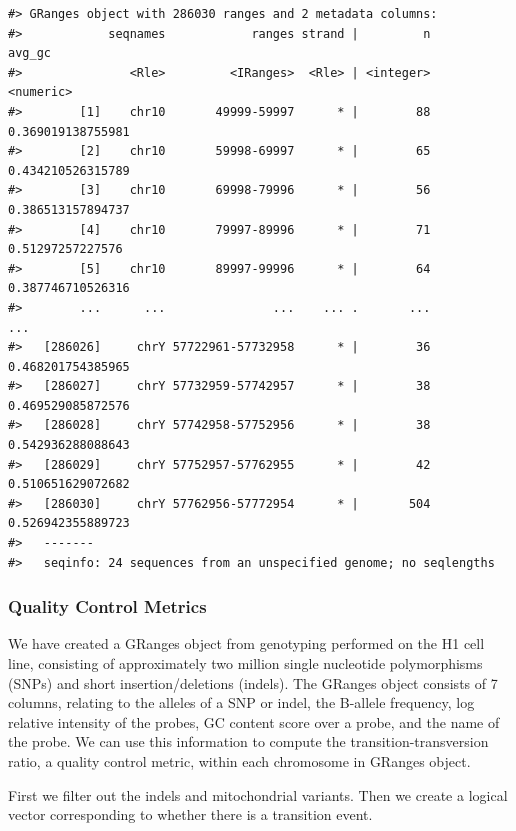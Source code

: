 \documentclass[]{article}
\begin{document}
\begin{verbatim}
#> GRanges object with 286030 ranges and 2 metadata columns:
#>            seqnames            ranges strand |         n            avg_gc
#>               <Rle>         <IRanges>  <Rle> | <integer>         <numeric>
#>        [1]    chr10       49999-59997      * |        88 0.369019138755981
#>        [2]    chr10       59998-69997      * |        65 0.434210526315789
#>        [3]    chr10       69998-79996      * |        56 0.386513157894737
#>        [4]    chr10       79997-89996      * |        71  0.51297257227576
#>        [5]    chr10       89997-99996      * |        64 0.387746710526316
#>        ...      ...               ...    ... .       ...               ...
#>   [286026]     chrY 57722961-57732958      * |        36 0.468201754385965
#>   [286027]     chrY 57732959-57742957      * |        38 0.469529085872576
#>   [286028]     chrY 57742958-57752956      * |        38 0.542936288088643
#>   [286029]     chrY 57752957-57762955      * |        42 0.510651629072682
#>   [286030]     chrY 57762956-57772954      * |       504 0.526942355889723
#>   -------
#>   seqinfo: 24 sequences from an unspecified genome; no seqlengths
\end{verbatim}

\hypertarget{quality-control-metrics}{%
\subsubsection{Quality Control Metrics}\label{quality-control-metrics}}

We have created a GRanges object from genotyping performed on the H1
cell line, consisting of approximately two million single nucleotide
polymorphisms (SNPs) and short insertion/deletions (indels). The GRanges
object consists of 7 columns, relating to the alleles of a SNP or indel,
the B-allele frequency, log relative intensity of the probes, GC content
score over a probe, and the name of the probe. We can use this
information to compute the transition-transversion ratio, a quality
control metric, within each chromosome in GRanges object.

First we filter out the indels and mitochondrial variants. Then we
create a logical vector corresponding to whether there is a transition
event.
\end{document}
